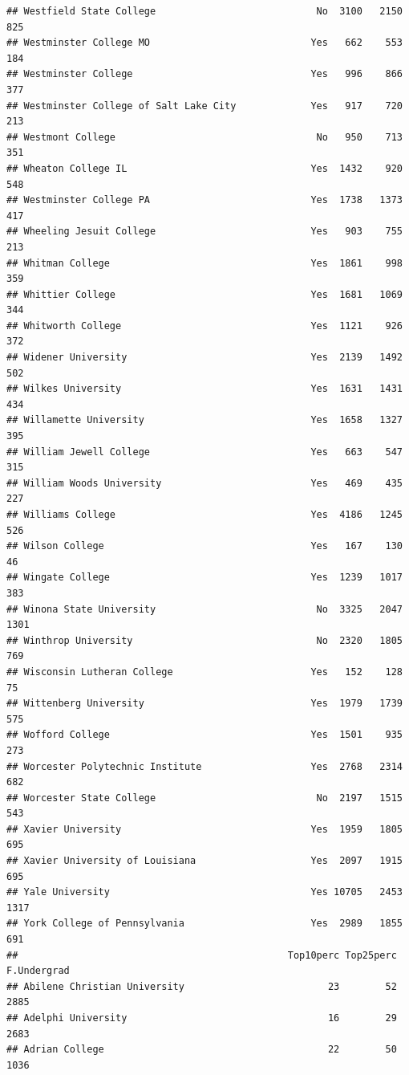 \documentclass[
]{article}
\begin{document}
\begin{verbatim}
## Westfield State College                            No  3100   2150    825
## Westminster College MO                            Yes   662    553    184
## Westminster College                               Yes   996    866    377
## Westminster College of Salt Lake City             Yes   917    720    213
## Westmont College                                   No   950    713    351
## Wheaton College IL                                Yes  1432    920    548
## Westminster College PA                            Yes  1738   1373    417
## Wheeling Jesuit College                           Yes   903    755    213
## Whitman College                                   Yes  1861    998    359
## Whittier College                                  Yes  1681   1069    344
## Whitworth College                                 Yes  1121    926    372
## Widener University                                Yes  2139   1492    502
## Wilkes University                                 Yes  1631   1431    434
## Willamette University                             Yes  1658   1327    395
## William Jewell College                            Yes   663    547    315
## William Woods University                          Yes   469    435    227
## Williams College                                  Yes  4186   1245    526
## Wilson College                                    Yes   167    130     46
## Wingate College                                   Yes  1239   1017    383
## Winona State University                            No  3325   2047   1301
## Winthrop University                                No  2320   1805    769
## Wisconsin Lutheran College                        Yes   152    128     75
## Wittenberg University                             Yes  1979   1739    575
## Wofford College                                   Yes  1501    935    273
## Worcester Polytechnic Institute                   Yes  2768   2314    682
## Worcester State College                            No  2197   1515    543
## Xavier University                                 Yes  1959   1805    695
## Xavier University of Louisiana                    Yes  2097   1915    695
## Yale University                                   Yes 10705   2453   1317
## York College of Pennsylvania                      Yes  2989   1855    691
##                                               Top10perc Top25perc F.Undergrad
## Abilene Christian University                         23        52        2885
## Adelphi University                                   16        29        2683
## Adrian College                                       22        50        1036

\end{verbatim}
\end{document}
